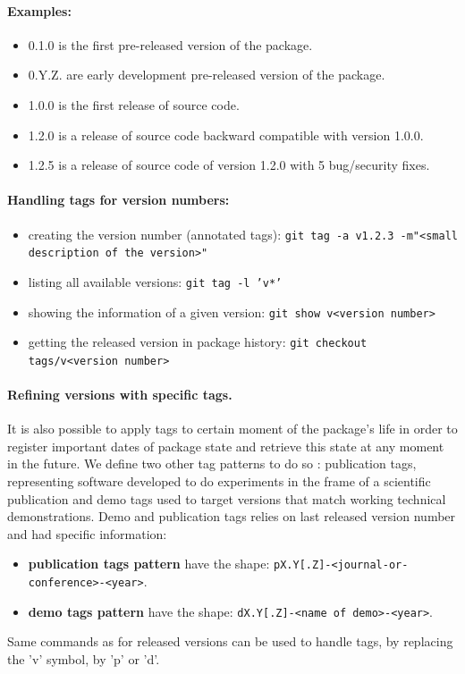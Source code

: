 \documentclass[12pt,a4paper]{article}
\begin{document}
\paragraph{Examples:}
\begin{itemize}
\item 0.1.0 is the first pre-released version of the package.
\item 0.Y.Z. are early development pre-released version of the package.
\item 1.0.0 is the first release of source code.
\item 1.2.0  is a release of source code backward compatible with version 1.0.0.
\item 1.2.5 is a release of source code of version 1.2.0 with 5 bug/security fixes.
\end{itemize}


\paragraph{Handling tags for version numbers:}
\begin{itemize}
\item creating the version number (annotated tags):
\linebreak \texttt{git tag -a v1.2.3 -m"<small description of the version>"}
\item listing all available versions: 
\linebreak \texttt{git tag -l 'v*'}
\item showing the information of a given version: 
\linebreak \texttt{git show v<version number>}
\item getting the released version in package history: 
\linebreak \texttt{git checkout tags/v<version number>}
\end{itemize}


\paragraph{Refining versions with specific tags.} It is also possible to apply tags to certain moment of the package's life in order to register important dates of package state and retrieve this state at any moment in the future. We define two other tag patterns to do so : publication tags, representing software developed to do experiments in the frame of a scientific publication and demo tags used to target versions that match working technical demonstrations. Demo and publication tags relies on last released version number and had specific information:
\begin{itemize}
\item \textbf{publication tags pattern} have the shape: \linebreak \texttt{pX.Y[.Z]-<journal-or-conference>-<year>}.
\item \textbf{demo tags pattern} have the shape:
\linebreak \texttt{dX.Y[.Z]-<name of demo>-<year>}.
\end{itemize}
Same commands as for released versions can be used to handle tags, by replacing the 'v' symbol, by 'p' or 'd'.
\end{document}
